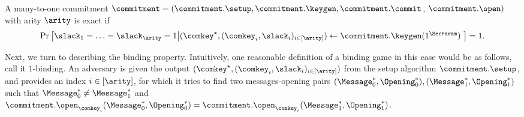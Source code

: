     \begin{definition}[Exactness]
        A many-to-one commitment $\commitment = (\commitment.\setup, \commitment.\keygen,\commitment.\commit$, $\commitment.\open)$ with arity $\arity$ is exact if 
        \[
         \Pr\left[
		\begin{matrix}
			\slack_1 = \ldots = \slack_\arity = 1
		\end{matrix}
		\middle|
		\begin{matrix}
			(\comkey^\star,(\comkey_i,\slack_i)_{i\in [\arity]}) \gets \commitment.\keygen(1^\SecParam) \
		\end{matrix}\right] = 1.
        \]
    \end{definition}
    
    \noindent Next, we turn to describing the binding property. Intuitively, one reasonable definition of a binding game in this case would be  as follows, call it $1$-binding. An adversary is given the output $(\comkey^\star,(\comkey_i,\slack_i)_{i\in [\arity]})$ from the setup algorithm $\commitment.\setup$, and provides an index $i \in [\arity]$, for which it tries to find two messages-opening pairs $(\Message^*_0,\Opening^*_0), (\Message^*_1,\Opening^*_1)$ such that $\Message^*_0 \neq \Message^*_1$ and  $\commitment.\open_{\comkey_i}(\Message^*_0, \Opening^*_0) = \commitment.\open_{\comkey_i}(\Message^*_1, \Opening^*_1)$.
    
